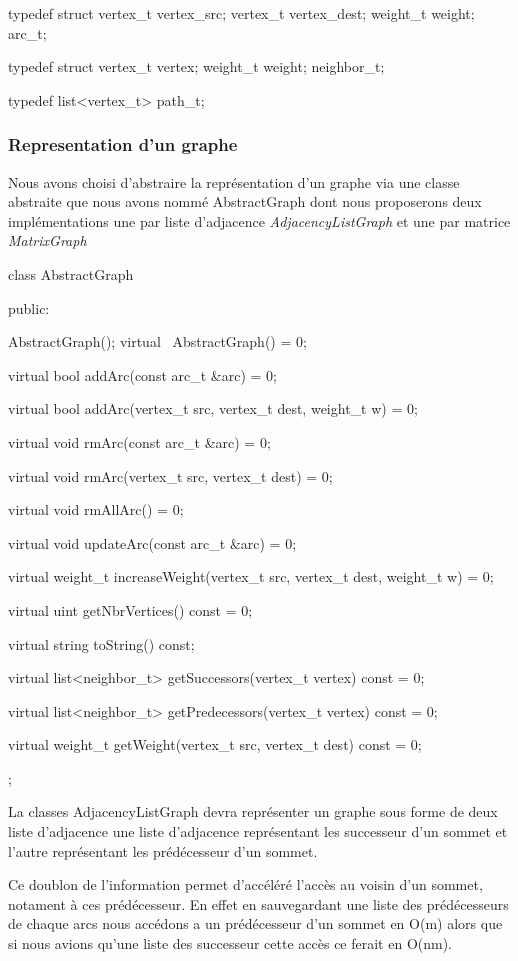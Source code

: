 typedef struct
{
  vertex_t vertex_src;
  vertex_t vertex_dest;
  weight_t weight;
} arc_t;

typedef struct
{
  vertex_t vertex;
  weight_t weight;
} neighbor_t;
  
typedef list<vertex_t> path_t;
    
\subsubsection{Representation d'un graphe}

Nous avons choisi d'abstraire la représentation d'un graphe via une
classe abstraite que nous avons nommé AbstractGraph dont nous proposerons
deux implémentations une par liste d'adjacence \emph{AdjacencyListGraph} 
et une par matrice \emph{MatrixGraph}

class AbstractGraph
{
public:

  AbstractGraph();
  virtual
  ~AbstractGraph() = 0;

  virtual bool
  addArc(const arc_t &arc) = 0;

  virtual bool
  addArc(vertex_t src, vertex_t dest, weight_t w) = 0;

  virtual void
  rmArc(const arc_t &arc) = 0;

  virtual void
  rmArc(vertex_t src, vertex_t dest) = 0;

  virtual void
  rmAllArc() = 0;

  virtual void
  updateArc(const arc_t &arc) = 0;

  virtual weight_t
  increaseWeight(vertex_t src, vertex_t dest, weight_t w) = 0;

  virtual uint
  getNbrVertices() const = 0;

  virtual string
  toString() const;

  virtual list<neighbor_t>
  getSuccessors(vertex_t vertex) const = 0;

  virtual list<neighbor_t>
  getPredecessors(vertex_t vertex) const = 0;

  virtual weight_t
  getWeight(vertex_t src, vertex_t dest) const = 0;

};


La classes AdjacencyListGraph devra représenter un graphe sous forme
de deux liste d'adjacence une liste d'adjacence représentant les 
successeur d'un sommet et l'autre représentant les prédécesseur d'un sommet.

Ce doublon de l'information permet d'accéléré l'accès au voisin d'un sommet, 
notament à ces prédécesseur. En effet en sauvegardant une liste des prédécesseurs
de chaque arcs nous accédons a un prédécesseur d'un sommet en O(m) alors 
que si nous avions qu'une liste des successeur cette accès ce ferait en 
O(nm).

